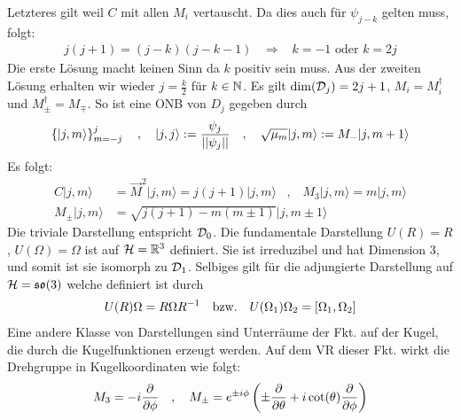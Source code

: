 Letzteres gilt weil $C$ mit allen $M_i$ vertauscht. Da dies auch für $\psi_{j-k}$
gelten muss, folgt:
\begin{align*}
    j(j+1) = (j-k)(j-k-1)
    \hspace{10pt} \Rightarrow \hspace{10pt}
    k = -1 \text{ oder } k = 2j
\end{align*}
Die erste Lösung macht keinen Sinn da $k$ positiv sein muss. Aus der zweiten
Lösung erhalten wir wieder $j = \frac{k}{2}$ für $k \in \mathbb{N}$. Es gilt
$\dim(\mathcal{D}_j) = 2j+1$, $M_i = M_i^\dagger$ und $M_\pm^\dagger = M_{\mp}$.
So ist eine ONB von $D_j$ gegeben durch
\begin{align*}
    \left\{ |j,m \rangle \right\}_{m=-j}^j
    \hspace{10pt} , \hspace{10pt}
    |j,j \rangle := \frac{\psi_j}{\left\vert\left\vert \psi_j \right\vert\right\vert}
    \hspace{10pt} , \hspace{10pt}
    \sqrt{\mu_m} |j,m \rangle := M_- |j,m+1 \rangle
\end{align*}
Es folgt:
\begin{align*}
    C |j,m \rangle &= \vec{M}^2 |j,m \rangle = j(j+1) |j,m \rangle
    \hspace{10pt} , \hspace{10pt}
    M_3 | j,m \rangle = m |j,m \rangle
    \\
    M_{\pm} | j,m \rangle &= \sqrt{j(j+1) - m(m \pm 1)} | j,m \pm 1 \rangle
\end{align*}
Die triviale Darstellung entspricht $\mathcal{D}_0$. Die fundamentale Darstellung
$U(R) = R$, $U(\Omega) = \Omega$ ist auf $\mathcal{H} = \mathbb{R}^3$ definiert. Sie ist
irreduzibel und hat Dimension 3, und somit ist sie isomorph zu $\mathcal{D}_1$.
Selbiges gilt für die adjungierte Darstellung auf $\mathcal{H} = \mathfrak{so}(3)$ welche definiert
ist durch
\begin{align*}
    U(R) \Omega = R \Omega R^{-1}
    \hspace{10pt} \text{bzw.} \hspace{10pt}
    U(\Omega_1) \Omega_2 = \left[ \Omega_1,\Omega_2 \right]
\end{align*}
Eine andere Klasse von Darstellungen sind Unterräume der Fkt. auf der Kugel,
die durch die Kugelfunktionen erzeugt werden. Auf dem VR dieser Fkt. wirkt
die Drehgruppe in Kugelkoordinaten wie folgt:
\begin{align*}
    M_3 = -i \frac{\partial}{\partial \phi}
    \hspace{10pt} , \hspace{10pt}
    M_\pm = e^{\pm i \phi} \left( \pm \frac{\partial}{\partial \theta} + i \cot(\theta) \frac{\partial}{\partial \phi} \right)
\end{align*}
